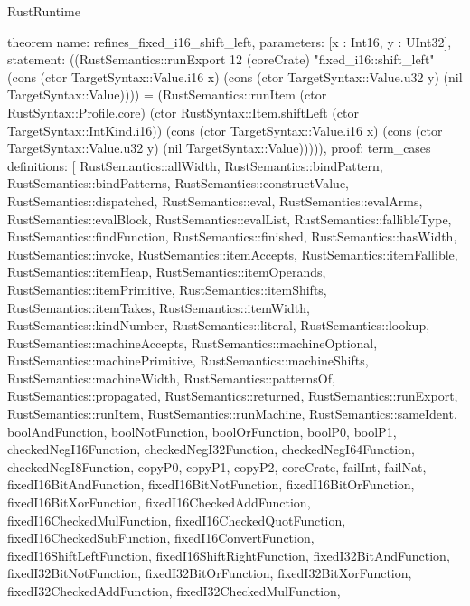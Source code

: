 \begin{lexlean}{RustRuntime}
\begin{semanticmodule}
theorem{
  name: refines_fixed_i16_shift_left,
  parameters: [x : Int16, y : UInt32],
  statement: ((RustSemantics::runExport 12 (coreCrate) "fixed_i16::shift_left" (cons (ctor TargetSyntax::Value.i16 x) (cons (ctor TargetSyntax::Value.u32 y) (nil TargetSyntax::Value)))) = (RustSemantics::runItem (ctor RustSyntax::Profile.core) (ctor RustSyntax::Item.shiftLeft (ctor TargetSyntax::IntKind.i16)) (cons (ctor TargetSyntax::Value.i16 x) (cons (ctor TargetSyntax::Value.u32 y) (nil TargetSyntax::Value))))),
  proof: term_cases{
    definitions: [
      RustSemantics::allWidth,
      RustSemantics::bindPattern,
      RustSemantics::bindPatterns,
      RustSemantics::constructValue,
      RustSemantics::dispatched,
      RustSemantics::eval,
      RustSemantics::evalArms,
      RustSemantics::evalBlock,
      RustSemantics::evalList,
      RustSemantics::fallibleType,
      RustSemantics::findFunction,
      RustSemantics::finished,
      RustSemantics::hasWidth,
      RustSemantics::invoke,
      RustSemantics::itemAccepts,
      RustSemantics::itemFallible,
      RustSemantics::itemHeap,
      RustSemantics::itemOperands,
      RustSemantics::itemPrimitive,
      RustSemantics::itemShifts,
      RustSemantics::itemTakes,
      RustSemantics::itemWidth,
      RustSemantics::kindNumber,
      RustSemantics::literal,
      RustSemantics::lookup,
      RustSemantics::machineAccepts,
      RustSemantics::machineOptional,
      RustSemantics::machinePrimitive,
      RustSemantics::machineShifts,
      RustSemantics::machineWidth,
      RustSemantics::patternsOf,
      RustSemantics::propagated,
      RustSemantics::returned,
      RustSemantics::runExport,
      RustSemantics::runItem,
      RustSemantics::runMachine,
      RustSemantics::sameIdent,
      boolAndFunction,
      boolNotFunction,
      boolOrFunction,
      boolP0,
      boolP1,
      checkedNegI16Function,
      checkedNegI32Function,
      checkedNegI64Function,
      checkedNegI8Function,
      copyP0,
      copyP1,
      copyP2,
      coreCrate,
      failInt,
      failNat,
      fixedI16BitAndFunction,
      fixedI16BitNotFunction,
      fixedI16BitOrFunction,
      fixedI16BitXorFunction,
      fixedI16CheckedAddFunction,
      fixedI16CheckedMulFunction,
      fixedI16CheckedQuotFunction,
      fixedI16CheckedSubFunction,
      fixedI16ConvertFunction,
      fixedI16ShiftLeftFunction,
      fixedI16ShiftRightFunction,
      fixedI32BitAndFunction,
      fixedI32BitNotFunction,
      fixedI32BitOrFunction,
      fixedI32BitXorFunction,
      fixedI32CheckedAddFunction,
      fixedI32CheckedMulFunction,
}}
\end{semanticmodule}
\end{lexlean}
